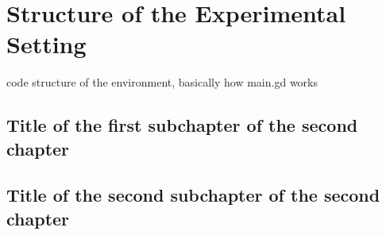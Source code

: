 \chapter{Structure of the Experimental Setting}
code structure of the environment, basically how main.gd works
\section{Title of the first subchapter of the second chapter}

\section{Title of the second subchapter of the second chapter}
